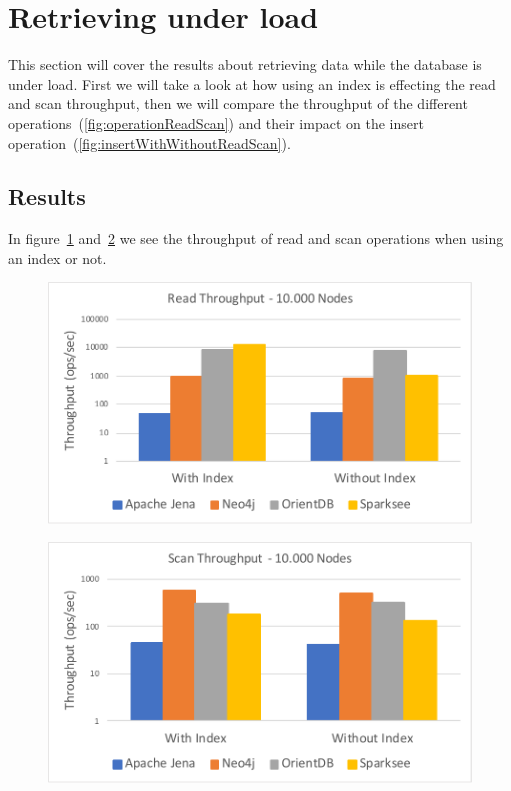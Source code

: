 \section{Retrieving under load}
\label{ch:evaluation:se:retrievingUnderLoad}
This section will cover the results about retrieving data while the database is under load.
First we will take a look at how using an index is effecting the read and scan throughput,
then we will compare the throughput of the different operations~(\ref{fig:operationReadScan}) and their impact on the insert operation~(\ref{fig:insertWithWithoutReadScan}).

\subsection{Results}
In figure~\ref{fig:readThroughput10000Nodes} and~\ref{fig:scanThroughput10000Nodes} we see the throughput of read and scan operations when using an index or not.

\begin{figure}[h!]
  \centering
  \includegraphics[width=.75\textwidth]{images/responsiveness/readThroughput10000Nodes}
  \label{fig:readThroughput10000Nodes}
\end{figure}

\begin{figure}[h!]
  \centering
  \includegraphics[width=.75\textwidth]{images/responsiveness/scanThroughput10000Nodes}
  \label{fig:scanThroughput10000Nodes}
\end{figure}

